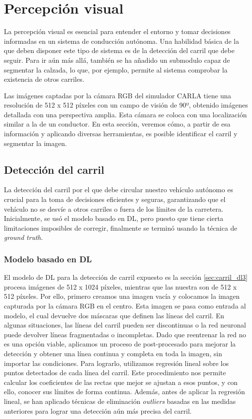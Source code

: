\section{Percepción visual}

La percepción visual es esencial para entender el entorno y tomar decisiones informadas en un sistema de conducción autónoma. Una habilidad básica de la que deben disponer este tipo de sistema es de la detección del carril que debe seguir. Para ir aún más allá, también se ha añadido un submodulo capaz de segmentar la calzada, lo que, por ejemplo, permite al sistema comprobar la existencia de otros carriles.

Las imágenes captadas por la cámara RGB del simulador CARLA tiene una resolución de 512 x 512 píxeles con un campo de visión de 90º, obtenido imágenes detallada con una perspectiva amplia. Esta cámara se coloca con una localización similar a la de un conductor. En esta sección, veremos cómo, a partir de esa información y aplicando diversas herramientas, es posible identificar el carril y segmentar la imagen.

\subsection{Detección del carril}

La detección del carril por el que debe circular nuestro vehículo autónomo es crucial para la toma de decisiones eficientes y seguras, garantizando que el vehículo no se desvíe a otros carriles o fuera de los límites de la carretera. Inicialmente, se usó el modelo basado en \ac{DL}, pero puesto que tiene cierta limitaciones imposibles de corregir, finalmente se terminó usando la técnica de \textit{ground truth}.

\subsubsection{Modelo basado en \ac{DL}}

El modelo de \ac{DL} para la detección de carril expuesto es la sección \ref{sec:carril_dl3} procesa imágenes de 512 x 1024 píxeles, mientras que las nuestra son de 512 x 512 píxeles. Por ello, primero creamos una imagen vacía y colocamos la imagen capturada por la cámara RGB en el centro. Esta imagen se pasa como entrada al modelo, el cual devuelve dos máscaras que definen las líneas del carril. En algunas situaciones, las líneas del carril pueden ser discontinuas o la red neuronal puede devolver líneas fragmentadas o incompletas. Dado que reentrenar la red no es una opción viable, aplicamos un proceso de post-procesado para mejorar la detección y obtener una línea continua y completa en toda la imagen, sin importar las condiciones. Para lograrlo, utilizamos regresión lineal sobre los puntos detectados de cada línea del carril. Este procedimiento nos permite calcular los coeficientes de las rectas que mejor se ajustan a esos puntos, y con ello, conocer sus límites de forma continua. Además, antes de aplicar la regresión lineal, se han aplicado técnicas de eliminación \textit{outliers} basadas en las medidas anteriores para lograr una detección aún más precisa del carril.

